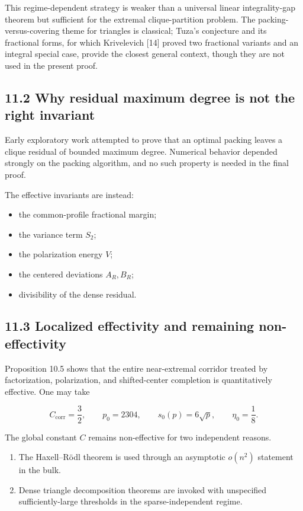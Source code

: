 \documentclass[english,11pt,a4paper]{article}
\providecommand{\tightlist}{\setlength{\itemsep}{0pt}\setlength{\parskip}{0pt}}
\begin{document}
This regime-dependent strategy is weaker than a universal linear
integrality-gap theorem but sufficient for the extremal clique-partition
problem. The packing-versus-covering theme for triangles is classical;
Tuza's conjecture and its fractional forms, for which Krivelevich
{[}14{]} proved two fractional variants and an integral special case,
provide the closest general context, though they are not used in the
present proof.

\subsection{11.2 Why residual maximum degree is not the right
invariant}\label{why-residual-maximum-degree-is-not-the-right-invariant}

Early exploratory work attempted to prove that an optimal packing leaves
a clique residual of bounded maximum degree. Numerical behavior depended
strongly on the packing algorithm, and no such property is needed in the
final proof.

The effective invariants are instead:

\begin{itemize}
\tightlist
\item
  the common-profile fractional margin;
\item
  the variance term \(S_2\);
\item
  the polarization energy \(V\);
\item
  the centered deviations \(A_R,B_R\);
\item
  divisibility of the dense residual.
\end{itemize}

\subsection{11.3 Localized effectivity and remaining
non-effectivity}\label{localized-effectivity-and-remaining-non-effectivity}

Proposition 10.5 shows that the entire near-extremal corridor treated by
factorization, polarization, and shifted-center completion is
quantitatively effective. One may take

\[
C_{\mathrm{corr}}=\frac32,
\qquad
p_0=2304,
\qquad
s_0(p)=6\sqrt p,
\qquad
\eta_0=\frac18.
\]

The global constant \(C\) remains non-effective for two independent
reasons.

\begin{enumerate}
\def\labelenumi{\arabic{enumi}.}
\tightlist
\item
  The Haxell--Rödl theorem is used through an asymptotic \(o(n^2)\)
  statement in the bulk.
\item
  Dense triangle decomposition theorems are invoked with unspecified
  sufficiently-large thresholds in the sparse-independent regime.
\end{enumerate}
\end{document}
